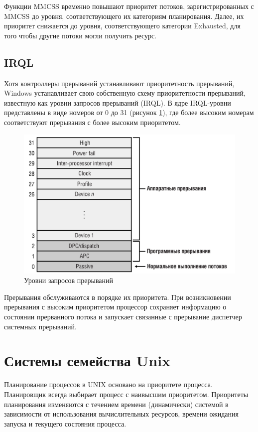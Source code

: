 Функции MMCSS временно повышают приоритет потоков, зарегистрированных с MMCSS до уровня, соответствующего их категориям планирования. Далее, их приоритет снижается до уровня, соответствующего категории Exhausted, для того чтобы другие потоки могли получить ресурс.

\subsection*{IRQL}

Хотя контроллеры прерываний устанавливают приоритетность прерываний, Windows устанавливает свою собственную схему приоритетности прерываний, известную как уровни запросов прерываний (IRQL). В ядре IRQL-уровни представлены в виде номеров от 0 до 31 (рисунок \ref{fig:irql}), где более высоким номерам соответствуют прерывания с более высоким приоритетом.

\begin{figure}[h!]
	\centering
	\includegraphics[width=0.90\linewidth]{img/irql.png}
	\caption{Уровни запросов прерываний}
	\label{fig:irql}
\end{figure}

Прерывания обслуживаются в порядке их приоритета. При возникновении прерывания с высоким приоритетом процессор сохраняет информацию о состоянии прерванного потока и запускает связанные с прерывание диспетчер системных прерываний.

\clearpage


\section*{Системы семейства Unix}

Планирование процессов в UNIX основано на приоритете процесса. Планировщик всегда выбирает процесс с наивысшим приоритетом. Приоритеты планирования изменяются с течением времени (динамически) системой в зависимости от использования вычислительных ресурсов, времени ожидания запуска и текущего состояния процесса. 

